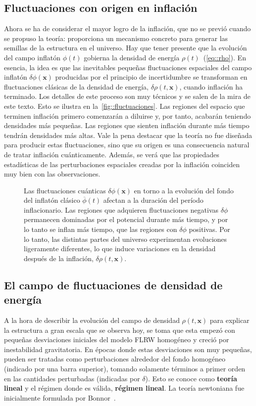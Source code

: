 \subsection{Fluctuaciones con origen en inflación}
Ahora se ha de considerar el mayor logro de la inflación, que no se previó cuando se propuso la teoría: proporciona un mecanismo concreto para generar las semillas de la estructura en el universo. Hay que tener presente que la evolución del campo inflatón \(\phi(t)\) gobierna la densidad de energía \(\rho(t)\)~(\ref{eq::rho}). En esencia, la idea es que las inevitables pequeñas fluctuaciones espaciales del campo inflatón \(\delta\phi(\symbf{x})\) producidas por el principio de incertidumbre se transforman en fluctuaciones clásicas de la densidad de energía, \(\delta\rho(t,\symbf{x})\), cuando inflación ha terminado. Los detalles de este proceso son muy técnicos y se salen de la mira de este texto. Esto se ilustra en la~\autoref{fig::fluctuaciones}. Las regiones del espacio que terminen inflación primero comenzarán a diluirse y, por tanto, acabarán teniendo densidades más pequeñas. Las regiones que sienten inflación durante más tiempo tendrán densidades más altas. Vale la pena destacar que la teoría no fue diseñada para producir estas fluctuaciones, sino que su origen es una consecuencia natural de tratar inflación cuánticamente. Además, se verá que las propiedades estadísticas de las perturbaciones espaciales creadas por la inflación coinciden muy bien con las observaciones.
\begin{figure}
    \centering
    \def\svgwidth{0.75\textwidth}
    
    \caption[Fluctuaciones cuánticas a clásicas]{Las fluctuaciones cuánticas \(\delta\phi(\symbf{x})\) en torno a la evolución del fondo del inflatón clásico \(\overbar{\phi}(t)\) afectan a la duración del período inflacionario. Las regiones que adquieren fluctuaciones negativas \(\delta\phi\) permanecen dominadas por el potencial durante más tiempo, y por lo tanto se inflan más tiempo, que las regiones con \(\delta\phi\) positivas. Por lo tanto, las distintas partes del universo experimentan evoluciones ligeramente diferentes, lo que induce variaciones en la densidad después de la inflación, \(\delta\rho(t,\symbf{x})\).}
    \label{fig::fluctuaciones}
\end{figure}
\subsection{El campo de fluctuaciones de densidad de energía}
A la hora de describir la evolución del campo de densidad \(\rho(t,\symbf{x})\) para explicar la estructura a gran escala que se observa hoy, se toma que esta empezó con pequeñas desviaciones iniciales del modelo FLRW homogéneo y creció por inestabilidad gravitatoria. En épocas donde estas desviaciones son muy pequeñas, pueden ser tratadas como perturbaciones alrededor del fondo homogéneo (indicado por una barra superior), tomando solamente términos a primer orden en las cantidades perturbadas (indicadas por \(\delta\)). Esto se conoce como \textbf{teoría lineal} y el régimen donde es válida, \textbf{régimen lineal}. La teoría newtoniana fue inicialmente formulada por Bonnor~\cite{bonnor1957jeans}.

